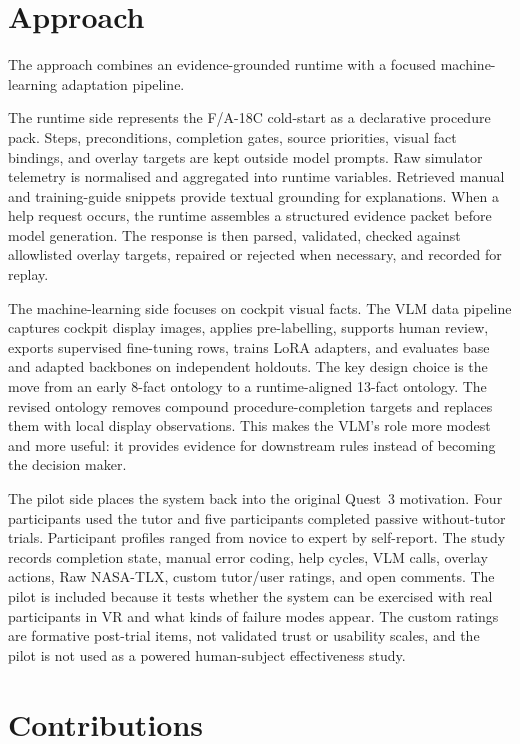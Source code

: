 \section{Approach}\label{sec:intro-approach}

The approach combines an evidence-grounded runtime with a focused machine-
learning adaptation pipeline.

The runtime side represents the F/A-18C cold-start as a declarative procedure
pack. Steps, preconditions, completion gates, source priorities, visual fact
bindings, and overlay targets are kept outside model prompts. Raw simulator
telemetry is normalised and aggregated into runtime variables. Retrieved manual
and training-guide snippets provide textual grounding for explanations. When a
help request occurs, the runtime assembles a structured evidence packet before
model generation. The response is then parsed, validated, checked against
allowlisted overlay targets, repaired or rejected when necessary, and recorded
for replay.

The machine-learning side focuses on cockpit visual facts. The VLM data
pipeline captures cockpit display images, applies pre-labelling, supports human
review, exports supervised fine-tuning rows, trains LoRA adapters, and evaluates
base and adapted backbones on independent holdouts. The key design choice is
the move from an early 8-fact ontology to a runtime-aligned 13-fact ontology.
The revised ontology removes compound procedure-completion targets and replaces
them with local display observations. This makes the VLM's role more modest
and more useful: it provides evidence for downstream rules instead of becoming
the decision maker.

The pilot side places the system back into the original Quest~3 motivation.
Four participants used the tutor and five participants completed passive
without-tutor trials. Participant profiles ranged from novice to expert by
self-report. The study records completion state, manual error coding, help
cycles, VLM calls, overlay actions, Raw NASA-TLX, custom tutor/user ratings,
and open comments. The pilot is included because it tests whether the system
can be exercised with real participants in VR and what kinds of failure modes
appear. The custom ratings are formative post-trial items, not validated
trust or usability scales, and the pilot is not used as a powered
human-subject effectiveness study.

\section{Contributions}\label{sec:intro-contributions}

